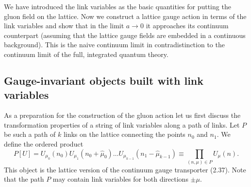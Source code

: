 We have introduced the link variables as the basic quantities for putting
the gluon field on the lattice. Now we construct a lattice gauge action in
terms of the link variables and show that in the limit $a \to 0$ it
approaches its continuum counterpart (assuming that the lattice gauge fields
are embedded in a continuous background). This is the naive continuum limit
in contradistinction to the continuum limit of the full, integrated quantum
theory.

\subsection{Gauge-invariant objects built with link variables}

As a preparation for the construction of the gluon action let us first
discuss the transformation properties of a string of link variables along a
path of links. Let $P$ be such a path of $k$ links on the lattice connecting
the points $n_0$ and $n_1$. We define the ordered product
\begin{equation}
  P[U] = U_{\mu_0}(n_0) U_{\mu_1}(n_0 + \hat\mu_0) \ldots
    U_{\mu_{k-1}}(n_1 - \hat\mu_{k-1})
  \equiv \prod_{(n,\mu)\in P} U_\mu(n) .
\end{equation}
This object is the lattice version of the continuum gauge transporter
(2.37). Note that the path $P$ may contain link variables for both
directions $\pm\mu$.

